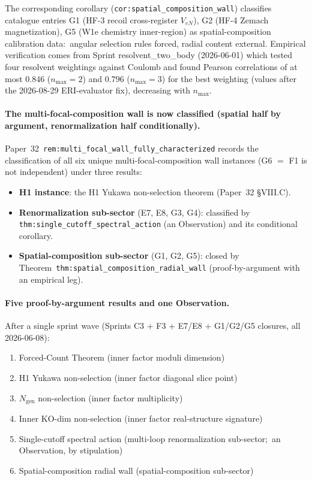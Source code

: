\documentclass[11pt,a4paper]{article}
\theoremstyle{plain}
\theoremstyle{definition}
\begin{document}
The corresponding corollary (\texttt{cor:spatial\_composition\_wall}) classifies catalogue entries G1 (HF-3 recoil cross-register $V_{eN}$), G2 (HF-4 Zemach magnetization), G5 (W1e chemistry inner-region) as spatial-composition calibration data:\ angular selection rules forced, radial content external. Empirical verification comes from Sprint resolvent\_two\_body (2026-06-01) which tested four resolvent weightings against Coulomb and found Pearson correlations of at most $0.846$ ($n_{\max} = 2$) and $0.796$ ($n_{\max} = 3$) for the best weighting (values after the 2026-08-29 ERI-evaluator fix), decreasing with $n_{\max}$.

\paragraph{The multi-focal-composition wall is now classified (spatial half by argument, renormalization half conditionally).} Paper~32~\texttt{rem:multi\_focal\_wall\_fully\_characterized} records the classification of all six unique multi-focal-composition wall instances (G6 $=$ F1 is not independent) under three results:
\begin{itemize}\setlength{\itemsep}{1pt}
  \item \textbf{H1 instance}: the H1 Yukawa non-selection theorem (Paper~32 \S VIII.C).
  \item \textbf{Renormalization sub-sector} (E7, E8, G3, G4): classified by \texttt{thm:single\_cutoff\_spectral\_action} (an Observation) and its conditional corollary.
  \item \textbf{Spatial-composition sub-sector} (G1, G2, G5): closed by Theorem~\texttt{thm:spatial\_composition\_radial\_wall} (proof-by-argument with an empirical leg).
\end{itemize}

\paragraph{Five proof-by-argument results and one Observation.} After a single sprint wave (Sprints C3 + F3 + E7/E8 + G1/G2/G5 closures, all 2026-06-08):
\begin{enumerate}\setlength{\itemsep}{1pt}
  \item Forced-Count Theorem (inner factor moduli dimension)
  \item H1 Yukawa non-selection (inner factor diagonal slice point)
  \item $N_{\mathrm{gen}}$ non-selection (inner factor multiplicity)
  \item Inner KO-dim non-selection (inner factor real-structure signature)
  \item Single-cutoff spectral action (multi-loop renormalization sub-sector;\ an Observation, by stipulation)
  \item Spatial-composition radial wall (spatial-composition sub-sector)
\end{enumerate}
\end{document}
